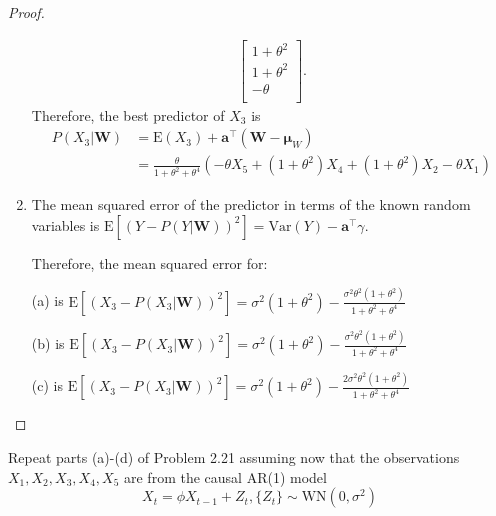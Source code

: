 \documentclass[12pt]{article}
\theoremstyle{definition}
\newenvironment{custompbm}[1]
  {\renewcommand\theproblem{#1}\problem}
  {\endproblem}
\newcommand{\E}{\text{E}}
\newcommand{\V}{\text{Var}}
\newcommand{\vect}[1]{\boldsymbol{#1}}
\begin{document}
\begin{proof}
\begin{enumerate}
\begin{align*}
\begin{bmatrix}
          1 + \theta^2 \\
          1 + \theta^2 \\
          -\theta \\
        \end{bmatrix}.
      \end{align*}
      Therefore, the best predictor of $X_3$ is
      \begin{align*}
        P(X_3|\vect{W}) &= \E(X_3) + \vect{a}^\intercal (\vect{W} - \vect{\mu}_W) \\
        &= \frac{\theta}{1 + \theta^2 + \theta^4} (- \theta  X_5 + (1 + \theta^2) X_4 + (1 + \theta^2) X_2 -\theta X_1)
      \end{align*}

    \item The mean squared error of the predictor in terms of the known random
      variables is $\E\left[ (Y - P(Y|\vect{W}))^2 \right] = \V(Y) - \vect{a}^\intercal \gamma$.

      Therefore, the mean squared error for:

      (a) is $\E\left[ (X_3 - P(X_3|\vect{W}))^2 \right] =
      \sigma^2 (1 + \theta^2) - \frac{\sigma^2\theta^2(1 + \theta^2)}{1 + \theta^2 + \theta^4}$

      (b) is $\E\left[ (X_3 - P(X_3|\vect{W}))^2 \right] =
      \sigma^2 (1 + \theta^2) - \frac{\sigma^2\theta^2(1 + \theta^2)}{1 + \theta^2 + \theta^4}$

      (c) is $\E\left[ (X_3 - P(X_3|\vect{W}))^2 \right] =
      \sigma^2 (1 + \theta^2) - \frac{2\sigma^2\theta^2(1 + \theta^2)}{1 + \theta^2 + \theta^4}$
  \end{enumerate}
\end{proof}


\begin{custompbm}{2.22}
  Repeat parts (a)-(d) of Problem 2.21 assuming now that the observations
  $X_1, X_2, X_3, X_4, X_5$ are from the causal AR(1) model
  \[
    X_t = \phi X_{t-1} + Z_t, \{Z_t\} \sim \text{WN}(0, \sigma^2)
  \]
\end{custompbm}
\end{document}
